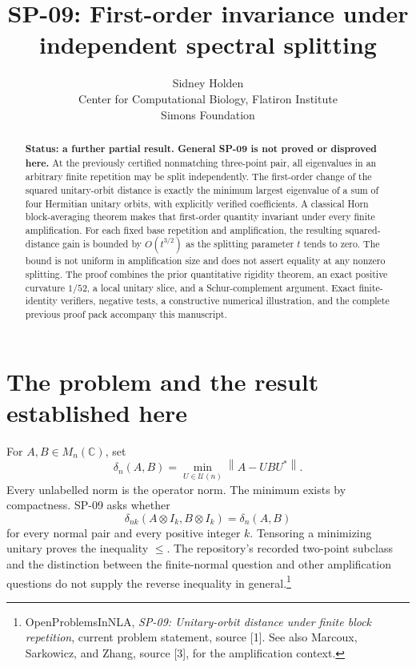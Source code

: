 \documentclass[11pt]{article}
\title{SP-09: First-order invariance under\\independent spectral splitting}
\author{Sidney Holden\\{\small Center for Computational Biology, Flatiron Institute}\\{\small Simons Foundation}}
\date{}
\theoremstyle{remark}\newtheorem{remark}[theorem]{Remark}
\newcommand{\C}{\mathbb C}
\newcommand{\U}{\mathcal U}
\newcommand{\dd}{\delta}
\newcommand{\norm}[1]{\left\lVert#1\right\rVert}
\begin{document}
\maketitle
\vspace{-1.5em}
\begin{abstract}
\noindent\textbf{Status: a further partial result. General SP-09 is not proved or disproved here.}
At the previously certified nonmatching three-point pair, all eigenvalues in an arbitrary finite repetition may be split independently. The first-order change of the squared unitary-orbit distance is exactly the minimum largest eigenvalue of a sum of four Hermitian unitary orbits, with explicitly verified coefficients. A classical Horn block-averaging theorem makes that first-order quantity invariant under every finite amplification. For each fixed base repetition and amplification, the resulting squared-distance gain is bounded by $O(t^{3/2})$ as the splitting parameter $t$ tends to zero. The bound is not uniform in amplification size and does not assert equality at any nonzero splitting. The proof combines the prior quantitative rigidity theorem, an exact positive curvature $1/52$, a local unitary slice, and a Schur-complement argument. Exact finite-identity verifiers, negative tests, a constructive numerical illustration, and the complete previous proof pack accompany this manuscript.
\end{abstract}

\section{The problem and the result established here}
For $A,B\in M_n(\C)$, set
\[
 \dd_n(A,B)=\min_{U\in\U(n)}\norm{A-UBU^*}.
\]
Every unlabelled norm is the operator norm. The minimum exists by compactness. SP-09 asks whether
\begin{equation}\label{eq:SP09}
 \dd_{nk}(A\otimes I_k,B\otimes I_k)=\dd_n(A,B)
\end{equation}
for every normal pair and every positive integer $k$. Tensoring a minimizing unitary proves the inequality $\le$. The repository's recorded two-point subclass and the distinction between the finite-normal question and other amplification questions do not supply the reverse inequality in general.\footnote{OpenProblemsInNLA, \emph{SP-09: Unitary-orbit distance under finite block repetition}, current problem statement, source [1]. See also Marcoux, Sarkowicz, and Zhang, source [3], for the amplification context.}
\end{document}
